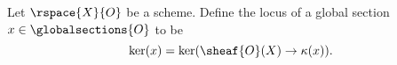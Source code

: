 \begin{definition}
Let $\rspace{X}{O}$ be a scheme.
Define the locus of 
a global section $x \in \globalsections{O}$ to be
\[\ker(x) = \ker(\sheaf{O}(X) \rightarrow \kappa(x)).\]
\end{definition}
